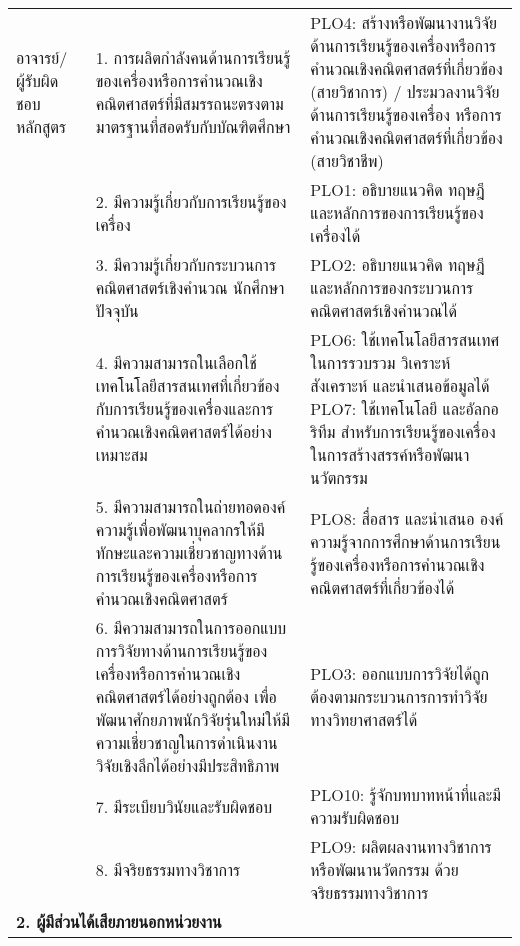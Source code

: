 \begin{longtable}{|p{} | p{}| p{} |}
อาจารย์/ผู้รับผิดชอบหลักสูตร & 
1. การผลิตกำลังคนด้านการเรียนรู้ของเครื่องหรือการคำนวณเชิงคณิตศาสตร์ที่มีสมรรถนะตรงตามมาตรฐานที่สอดรับกับบัณฑิตศึกษา
& PLO4: สร้างหรือพัฒนางานวิจัยด้านการเรียนรู้ของเครื่องหรือการคำนวณเชิงคณิตศาสตร์ที่เกี่ยวข้อง (สายวิชาการ) / ประมวลงานวิจัยด้านการเรียนรู้ของเครื่อง หรือการคำนวณเชิงคณิตศาสตร์ที่เกี่ยวข้อง (สายวิชาชีพ)\\ \cline{2-3}
&2. มีความรู้เกี่ยวกับการเรียนรู้ของเครื่อง & PLO1: อธิบายแนวคิด ทฤษฎี และหลักการของการเรียนรู้ของเครื่องได้ \\ \cline{2-3}
&3. มีความรู้เกี่ยวกับกระบวนการคณิตศาสตร์เชิงคำนวณ 
นักศึกษาปัจจุบัน & PLO2: อธิบายแนวคิด ทฤษฎี และหลักการของกระบวนการคณิตศาสตร์เชิงคำนวณได้ \\ \cline{2-3}
&4. มีความสามารถในเลือกใช้เทคโนโลยีสารสนเทศที่เกี่ยวข้องกับการเรียนรู้ของเครื่องและการคำนวณเชิงคณิตศาสตร์ได้อย่างเหมาะสม & PLO6: ใช้เทคโนโลยีสารสนเทศในการรวบรวม วิเคราะห์ สังเคราะห์ และนำเสนอข้อมูลได้ \newline PLO7: ใช้เทคโนโลยี และอัลกอริทึม สำหรับการเรียนรู้ของเครื่องในการสร้างสรรค์หรือพัฒนานวัตกรรม \\ \cline{2-3}
&5. มีความสามารถในถ่ายทอดองค์ความรู้เพื่อพัฒนาบุคลากรให้มีทักษะและความเชี่ยวชาญทางด้านการเรียนรู้ของเครื่องหรือการคำนวณเชิงคณิตศาสตร์ & PLO8: สื่อสาร และนำเสนอ องค์ความรู้จากการศึกษาด้านการเรียนรู้ของเครื่องหรือการคำนวณเชิงคณิตศาสตร์ที่เกี่ยวข้องได้ \\ \cline{2-3}
&6.  มีความสามารถในการออกแบบการวิจัยทางด้านการเรียนรู้ของเครื่องหรือการคำนวณเชิงคณิตศาสตร์ได้อย่างถูกต้อง เพื่อพัฒนาศักยภาพนักวิจัยรุ่นใหม่ให้มีความเชี่ยวชาญในการดำเนินงานวิจัยเชิงลึกได้อย่างมีประสิทธิภาพ & PLO3: ออกแบบการวิจัยได้ถูกต้องตามกระบวนการการทำวิจัยทางวิทยาศาสตร์ได้ \\ \cline{2-3}
&7. มีระเบียบวินัยและรับผิดชอบ	 & PLO10: รู้จักบทบาทหน้าที่และมีความรับผิดชอบ \\ \cline{2-3}
&8. มีจริยธรรมทางวิชาการ &	PLO9: ผลิตผลงานทางวิชาการ หรือพัฒนานวัตกรรม ด้วยจริยธรรมทางวิชาการ \\ \hline


\multicolumn{3}{|l|}{\textbf{2. ผู้มีส่วนได้เสียภายนอกหน่วยงาน}} \\ \hline


\end{longtable}
